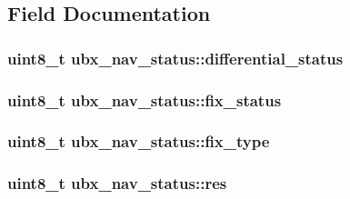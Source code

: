 \subsection{Field Documentation}
\hypertarget{structubx__nav__status_ac604bac5db58fe34c0aedfdd019b4b1c}{
\subsubsection[{differential\+\_\+status}]{\setlength{\rightskip}{0pt plus 5cm}uint8\+\_\+t ubx\+\_\+nav\+\_\+status\+::differential\+\_\+status}}\label{structubx__nav__status_ac604bac5db58fe34c0aedfdd019b4b1c}
\hypertarget{structubx__nav__status_acd3ec0ce15e37809d2d88816a3157354}{
\subsubsection[{fix\+\_\+status}]{\setlength{\rightskip}{0pt plus 5cm}uint8\+\_\+t ubx\+\_\+nav\+\_\+status\+::fix\+\_\+status}}\label{structubx__nav__status_acd3ec0ce15e37809d2d88816a3157354}
\hypertarget{structubx__nav__status_ac2afbba014156a4178fc756666e6d221}{
\subsubsection[{fix\+\_\+type}]{\setlength{\rightskip}{0pt plus 5cm}uint8\+\_\+t ubx\+\_\+nav\+\_\+status\+::fix\+\_\+type}}\label{structubx__nav__status_ac2afbba014156a4178fc756666e6d221}
\hypertarget{structubx__nav__status_a52766c9f5312cfa71d4916538f3614d7}{
\subsubsection[{res}]{\setlength{\rightskip}{0pt plus 5cm}uint8\+\_\+t ubx\+\_\+nav\+\_\+status\+::res}}\label{structubx__nav__status_a52766c9f5312cfa71d4916538f3614d7}

